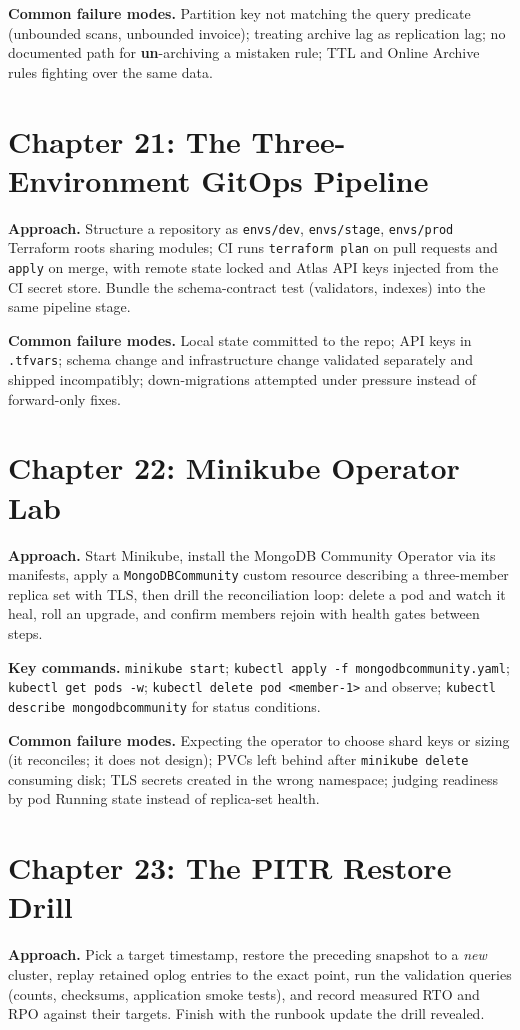 \textbf{Common failure modes.} Partition key not matching the query predicate (unbounded scans,
unbounded invoice); treating archive lag as replication lag; no documented path for
\textbf{un}-archiving a mistaken rule; TTL and Online Archive rules fighting over the same data.

\section{Chapter 21: The Three-Environment GitOps Pipeline}
\textbf{Approach.} Structure a repository as \texttt{envs/dev}, \texttt{envs/stage},
\texttt{envs/prod} Terraform roots sharing modules; CI runs \texttt{terraform plan} on pull
requests and \texttt{apply} on merge, with remote state locked and Atlas API keys injected from
the CI secret store. Bundle the schema-contract test (validators, indexes) into the same pipeline
stage.

\textbf{Common failure modes.} Local state committed to the repo; API keys in
\texttt{.tfvars}; schema change and infrastructure change validated separately and shipped
incompatibly; down-migrations attempted under pressure instead of forward-only fixes.

\section{Chapter 22: Minikube Operator Lab}
\textbf{Approach.} Start Minikube, install the MongoDB Community Operator via its manifests,
apply a \texttt{MongoDBCommunity} custom resource describing a three-member replica set with
TLS, then drill the reconciliation loop: delete a pod and watch it heal, roll an upgrade, and
confirm members rejoin with health gates between steps.

\textbf{Key commands.} \texttt{minikube start}; \texttt{kubectl apply -f
mongodbcommunity.yaml}; \texttt{kubectl get pods -w}; \texttt{kubectl delete pod <member-1>} and
observe; \texttt{kubectl describe mongodbcommunity} for status conditions.

\textbf{Common failure modes.} Expecting the operator to choose shard keys or sizing (it
reconciles; it does not design); PVCs left behind after \texttt{minikube delete} consuming disk;
TLS secrets created in the wrong namespace; judging readiness by pod Running state instead of
replica-set health.

\section{Chapter 23: The PITR Restore Drill}
\textbf{Approach.} Pick a target timestamp, restore the preceding snapshot to a \emph{new}
cluster, replay retained oplog entries to the exact point, run the validation queries (counts,
checksums, application smoke tests), and record measured RTO and RPO against their targets.
Finish with the runbook update the drill revealed.

